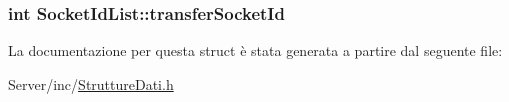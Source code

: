 \subsubsection[{\texorpdfstring{transfer\+Socket\+Id}{transferSocketId}}]{\setlength{\rightskip}{0pt plus 5cm}int Socket\+Id\+List\+::transfer\+Socket\+Id}\hypertarget{structSocketIdList_a5a7568a90af3231f5c125ef0c63e47db}{}\label{structSocketIdList_a5a7568a90af3231f5c125ef0c63e47db}


La documentazione per questa struct è stata generata a partire dal seguente file\+:\begin{DoxyCompactItemize}
\item 
Server/inc/\hyperlink{StruttureDati_8h}{Strutture\+Dati.\+h}\end{DoxyCompactItemize}
